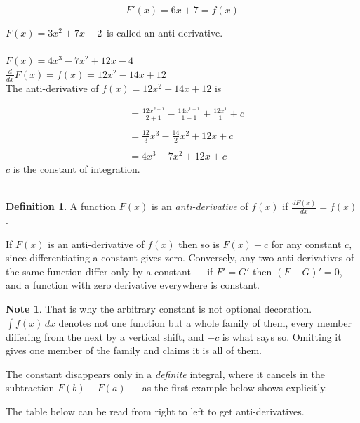 \documentclass[11pt,a4paper]{article}
\theoremstyle{definition}
\newtheorem{definition}[thm]{Definition}
\newtheorem{note}[thm]{Note}
\begin{document}
$$F'(x) = 6x + 7 = f(x)$$

$F(x) = 3x^2 + 7x - 2\,$ is called an anti-derivative.\\\\


$F(x) = 4x^3 - 7x^2 + 12x - 4$\\

$\frac{d}{dx}F(x) = f(x) = 12x^2 - 14x + 12$\\


The anti-derivative of $f(x) = 12x^2 - 14x + 12$ is 

\begin{align*}
&  = \frac{12 x^{2+1}}{2 + 1} - \frac{14x^{1+1}}{1 + 1} + \frac{12 x^1}{1}  + c\\\\
& = \frac{12}{3}x^3 - \frac{14}{2}x^2 + 12x + c\\\\
& = 4x^3 - 7x^2 + 12x + c
\end{align*}
$c$ is the constant of integration.\\\\









\begin{definition}
A function $F(x)$ is an \emph{anti-derivative} of $f(x)$ if
$\frac{dF(x)}{dx}=f(x)$.
\end{definition}

If $F(x)$ is an anti-derivative of $f(x)$ then so is $F(x)+c$ for any constant $c$,
since differentiating a constant gives zero. Conversely, any two anti-derivatives
of the same function differ only by a constant --- if $F'=G'$ then $(F-G)'=0$, and
a function with zero derivative everywhere is constant.

\begin{note}
That is why the arbitrary constant is not optional decoration. $\int f(x)\,dx$
denotes not one function but a whole family of them, every member differing from
the next by a vertical shift, and $+c$ is what says so. Omitting it gives one
member of the family and claims it is all of them.

The constant disappears only in a \emph{definite} integral, where it cancels in
the subtraction $F(b)-F(a)$ --- as the first example below shows explicitly.
\end{note}

The table below can be read from right to left to get anti-derivatives.\\
\end{document}
